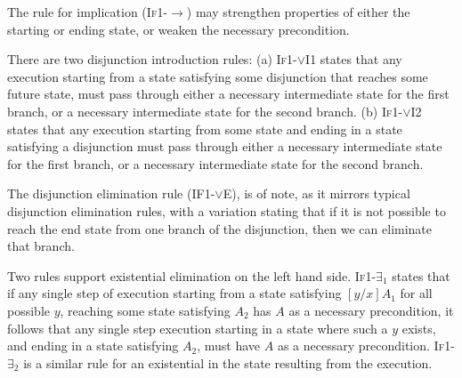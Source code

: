 The  rule for implication (\textsc{If1-$\longrightarrow$}) may strengthen
 properties of either the starting or ending state, or 
weaken the necessary precondition. 

There are two disjunction introduction rules: 
(a) \textsc{If1-$\vee$I1} states that any execution
starting from a state satisfying some disjunction that reaches some future state, 
must pass through either a necessary 
intermediate state for the first branch, or a necessary 
intermediate state for the second branch.
(b) \textsc{If1-$\vee$I2} states that any execution 
starting from some state and ending in a state satisfying a disjunction
must pass through either a necessary intermediate state for 
the first branch, or a necessary intermediate state for the second branch.


The disjunction
elimination rule (\textsc{IF1-$\vee$E}), 
is of note, as it mirrors typical disjunction elimination
rules, with a variation stating that if it is not possible  to reach 
the end state from one branch of the disjunction, then we can eliminate 
that branch. 

Two rules support existential elimination on the left hand side.
\textsc{If1-$\exists_1$} states that if any single step of execution starting
from a state satisfying $[y/x]A_1$ for all possible $y$, reaching some state satisfying
$A_2$ has $A$ as a necessary precondition, it follows that any single step execution
starting in a state where such a $y$ exists, and ending in a state satisfying $A_2$,
must have $A$ as a necessary precondition. \textsc{If1-$\exists_2$} is a similar rule
for an existential in the state resulting from the execution.


